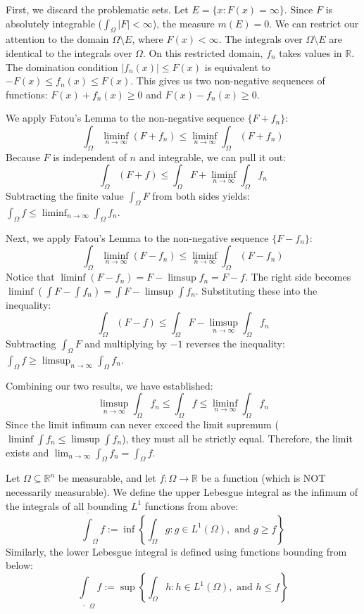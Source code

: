 \begin{pfbox}
    First, we discard the problematic sets. Let $E = \{x : F(x) = \infty\}$. Since $F$ is absolutely integrable ($\int_\Omega |F| < \infty$), the measure $m(E) = 0$.
    We can restrict our attention to the domain $\Omega \setminus E$, where $F(x) < \infty$. The integrals over $\Omega \setminus E$ are identical to the integrals over $\Omega$. On this restricted domain, $f_n$ takes values in $\mathbb{R}$.
    The domination condition $|f_n(x)| \le F(x)$ is equivalent to $-F(x) \le f_n(x) \le F(x)$. This gives us two non-negative sequences of functions: $F(x) + f_n(x) \ge 0$ and $F(x) - f_n(x) \ge 0$.
    
    We apply Fatou's Lemma to the non-negative sequence $\{F + f_n\}$:
    $$ \int_\Omega \liminf_{n\to\infty} (F+f_n) \le \liminf_{n\to\infty} \int_\Omega (F+f_n) $$
    Because $F$ is independent of $n$ and integrable, we can pull it out:
    $$ \int_\Omega (F+f) \le \int_\Omega F + \liminf_{n\to\infty} \int_\Omega f_n $$
    Subtracting the finite value $\int_\Omega F$ from both sides yields: $\int_\Omega f \le \liminf_{n\to\infty} \int_\Omega f_n$.

    Next, we apply Fatou's Lemma to the non-negative sequence $\{F - f_n\}$:
    $$ \int_\Omega \liminf_{n\to\infty} (F-f_n) \le \liminf_{n\to\infty} \int_\Omega (F-f_n) $$
    Notice that $\liminf (F - f_n) = F - \limsup f_n = F - f$. The right side becomes $\liminf (\int F - \int f_n) = \int F - \limsup \int f_n$.
    Substituting these into the inequality:
    $$ \int_\Omega (F-f) \le \int_\Omega F - \limsup_{n\to\infty} \int_\Omega f_n $$
    Subtracting $\int_\Omega F$ and multiplying by $-1$ reverses the inequality: $\int_\Omega f \ge \limsup_{n\to\infty} \int_\Omega f_n$.
    
    Combining our two results, we have established:
    $$ \limsup_{n\to\infty} \int_\Omega f_n \le \int_\Omega f \le \liminf_{n\to\infty} \int_\Omega f_n $$
    Since the limit infimum can never exceed the limit supremum ($\liminf \int f_n \le \limsup \int f_n$), they must all be strictly equal. Therefore, the limit exists and $\displaystyle\lim_{n\to\infty} \int_\Omega f_n = \int_\Omega f$.
\end{pfbox}


\begin{definition}
    Let $\Omega \subseteq \mathbb{R}^n$ be measurable, and let $f: \Omega \rightarrow \mathbb{R}$ be a function (which is NOT necessarily measurable).
    We define the upper Lebesgue integral as the infimum of the integrals of all bounding $L^1$ functions from above:
    $$ \overline{\int}_\Omega f := \inf \left\{ \int_\Omega g : g \in L^1(\Omega), \text{ and } g \ge f \right\} $$
    Similarly, the lower Lebesgue integral is defined using functions bounding from below:
    $$ \underline{\int}_\Omega f := \sup \left\{ \int_\Omega h : h \in L^1(\Omega), \text{ and } h \le f \right\} $$
\end{definition}

